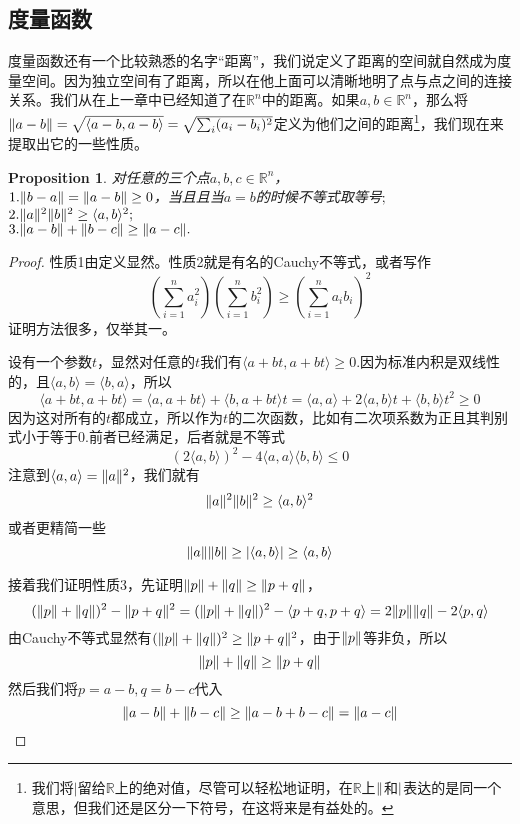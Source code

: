 \documentclass[11pt,a4paper,openany]{book}%
\theoremstyle{plain}%
\newtheorem{pro}{Proposition}[chapter]%
\begin{document}
\subsection{度量函数}
度量函数还有一个比较熟悉的名字“距离”，我们说定义了距离的空间就自然成为度量空间。因为独立空间有了距离，所以在他上面可以清晰地明了点与点之间的连接关系。我们从在上一章中已经知道了在$\mathbb{R}^n$中的距离。如果$a,b \in \mathbb{R}^n$，那么将$\Arrowvert a-b \Arrowvert=\sqrt{\langle a-b,a-b\rangle}=\sqrt{\sum_i (a_i-b_i)^2}$定义为他们之间的距离\footnote{我们将$|$留给$\mathbb{R}$上的绝对值，尽管可以轻松地证明，在$\mathbb{R}$上$\Arrowvert$和$\arrowvert$表达的是同一个意思，但我们还是区分一下符号，在这将来是有益处的。}，我们现在来提取出它的一些性质。
\begin{pro}对任意的三个点$a,b,c \in \mathbb{R}^n$，\\
$1.\Arrowvert b-a\Arrowvert =\Arrowvert a-b\Arrowvert \geq0 $，当且且当$a=b$的时候不等式取等号$;$\\
$2.\Arrowvert a\Arrowvert ^2\Arrowvert b\Arrowvert ^2\geq \langle a, b \rangle^2;$\\
$3.\Arrowvert a-b\Arrowvert +\Arrowvert b-c\Arrowvert \geq \Arrowvert a-c\Arrowvert .$
\end{pro}
\begin{proof}
性质1由定义显然。性质2就是有名的Cauchy不等式，或者写作
\begin{equation}
\left( \sum_{i=1}^n a_i^2\right)\left( \sum_{i=1}^n b_i^2\right) \geq \left( \sum_{i=1}^n a_ib_i\right)^2
\end{equation}
证明方法很多，仅举其一。

设有一个参数$t$，显然对任意的$t$我们有$\langle a+bt,a+bt\rangle \geq 0$.因为标准内积是双线性的，且$\langle a,b\rangle=\langle b,a\rangle$，所以
\[
\langle a+bt,a+bt\rangle=\langle a,a+bt\rangle+\langle b,a+bt\rangle t=\langle a,a\rangle+2\langle a,b\rangle t+\langle b,b\rangle t^2 \geq 0
\]
因为这对所有的$t$都成立，所以作为$t$的二次函数，比如有二次项系数为正且其判别式小于等于0.前者已经满足，后者就是不等式
\[
(2\langle a,b\rangle)^2-4\langle a,a\rangle\langle b,b\rangle \leq 0
\]
注意到$\langle a,a\rangle=\Arrowvert a\Arrowvert ^2$，我们就有
\[
\Arrowvert a\Arrowvert ^2\Arrowvert b\Arrowvert ^2\geq \langle a, b \rangle^2
\]
或者更精简一些
\[
\Arrowvert a\Arrowvert \Arrowvert b\Arrowvert \geq \arrowvert \langle a, b \rangle\arrowvert  \geq \langle a, b \rangle
\]

接着我们证明性质3，先证明$\Arrowvert p\Arrowvert +\Arrowvert q\Arrowvert \geq \Arrowvert p+q\Arrowvert $，
\[
(\Arrowvert p\Arrowvert +\Arrowvert q\Arrowvert )^2-\Arrowvert p+q\Arrowvert ^2=(\Arrowvert p\Arrowvert +\Arrowvert q\Arrowvert )^2-\langle p+q,p+q \rangle=2\Arrowvert p\Arrowvert \Arrowvert q\Arrowvert -2\langle p, q \rangle
\]
由Cauchy不等式显然有$(\Arrowvert p\Arrowvert +\Arrowvert q\Arrowvert )^2\geq \Arrowvert p+q\Arrowvert ^2$，由于$\Arrowvert p\Arrowvert $等非负，所以
\[
\Arrowvert p\Arrowvert +\Arrowvert q\Arrowvert \geq \Arrowvert p+q\Arrowvert
\]
然后我们将$p=a-b,q=b-c$代入
\[
\Arrowvert a-b\Arrowvert +\Arrowvert b-c\Arrowvert \geq \Arrowvert a-b+b-c\Arrowvert=\Arrowvert a-c\Arrowvert
\]
\end{proof}
\end{document}
